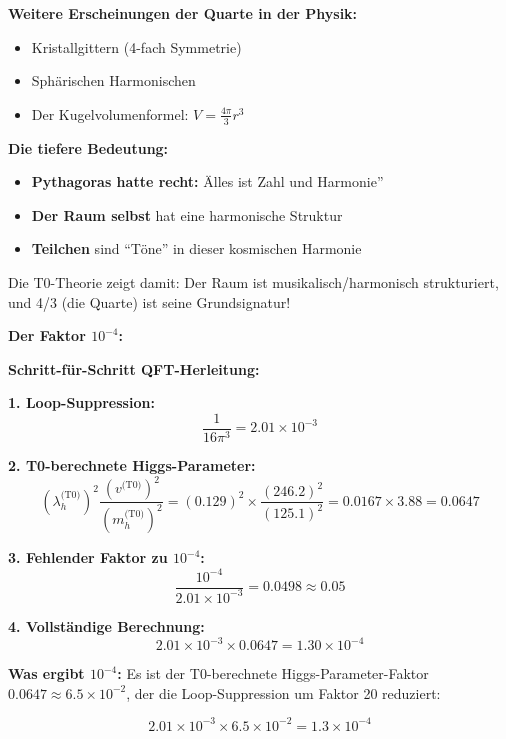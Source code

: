 \documentclass[12pt,a4paper]{article}
\begin{document}
\textbf{Weitere Erscheinungen der Quarte in der Physik:}
\begin{itemize}
	\item Kristallgittern (4-fach Symmetrie)
	\item Sphärischen Harmonischen
	\item Der Kugelvolumenformel: $V = \frac{4\pi}{3}r^3$
\end{itemize}

\textbf{Die tiefere Bedeutung:}
\begin{itemize}
	\item \textbf{Pythagoras hatte recht:} Älles ist Zahl und Harmonie''
	\item \textbf{Der Raum selbst} hat eine harmonische Struktur
	\item \textbf{Teilchen} sind ``Töne'' in dieser kosmischen Harmonie
\end{itemize}

Die T0-Theorie zeigt damit: Der Raum ist musikalisch/harmonisch strukturiert, und 4/3 (die Quarte) ist seine Grundsignatur!

\textbf{Der Faktor $10^{-4}$:}

\textbf{Schritt-für-Schritt QFT-Herleitung:}

\textbf{1. Loop-Suppression:}
\begin{equation}
	\frac{1}{16\pi^3} = 2.01 \times 10^{-3}
\end{equation}

\textbf{2. T0-berechnete Higgs-Parameter:}
\begin{equation}
	(\lambda_h^{\text{(T0)}})^2 \frac{(v^{\text{(T0)}})^2}{(m_h^{\text{(T0)}})^2} = (0.129)^2 \times \frac{(246.2)^2}{(125.1)^2} = 0.0167 \times 3.88 = 0.0647
\end{equation}

\textbf{3. Fehlender Faktor zu $10^{-4}$:}
\begin{equation}
	\frac{10^{-4}}{2.01 \times 10^{-3}} = 0.0498 \approx 0.05
\end{equation}

\textbf{4. Vollständige Berechnung:}
\begin{equation}
	2.01 \times 10^{-3} \times 0.0647 = 1.30 \times 10^{-4}
\end{equation}

\textbf{Was ergibt $10^{-4}$:}
Es ist der T0-berechnete Higgs-Parameter-Faktor $0.0647 \approx 6.5 \times 10^{-2}$, der die Loop-Suppression um Faktor 20 reduziert:

\begin{equation}
	2.01 \times 10^{-3} \times 6.5 \times 10^{-2} = 1.3 \times 10^{-4}
\end{equation}
\end{document}
